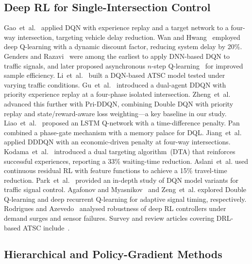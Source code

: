 \documentclass[conference]{IEEEtran}
\begin{document}
\subsection{Deep RL for Single-Intersection Control}

Gao~et~al.~\cite{Gao2017AdaptiveTSA} applied DQN with experience
replay and a target network to a four-way intersection, targeting
vehicle delay reduction. Wan and Hwang~\cite{Wan2018ValuebasedDRE}
employed deep Q-learning with a dynamic discount factor, reducing
system delay by 20\%. Genders and Razavi~\cite{Genders2016UsingADAY}
were among the earliest to apply DNN-based DQN to traffic signals,
and later proposed asynchronous $n$-step
Q-learning~\cite{Genders2019AsynchronousNQAV} for improved
sample efficiency. Li~et~al.~\cite{Li2020AdaptiveTSN} built a
DQN-based ATSC model tested under varying traffic conditions.
Gu~et~al.~\cite{Gu2020DoubleDQD} introduced a dual-agent DDQN
with priority experience replay at a four-phase isolated
intersection. Zheng~et~al.~\cite{Zheng2024PriDDQNLAG} advanced
this further with Pri-DDQN, combining Double DQN with priority
replay and state/reward-aware loss weighting---a key baseline in
our study. Liao~et~al.~\cite{Liao2020TimeDPQ} proposed an LSTM Q-network
with a time-difference penalty. Pan~\cite{Pan2023TrafficLCR}
combined a phase-gate mechanism with a memory palace for DQL.
Jiang~et~al.~\cite{Jiang2022EconomicDrivenATAI} applied DDDQN with
an economic-driven penalty at four-way intersections.
Kodama~et~al.~\cite{Kodama2022TrafficSCAA} introduced a dual
targeting algorithm~(DTA) that reinforces successful experiences,
reporting a 33\% waiting-time reduction. Aslani~et~al.
\cite{Aslani2018ContinuousRRZ} used continuous residual RL with
feature functions to achieve a 15\% travel-time reduction.
Park~et~al.~\cite{Park2021DeepQTAM} provided an in-depth study of
DQN model variants for traffic signal control. Agafonov and
Myasnikov~\cite{Agafonov2021TrafficSCBQ} and Zeng~et~al.
\cite{Zeng2018AdaptiveTSAU} explored Double Q-learning and deep
recurrent Q-learning for adaptive signal timing, respectively.
Rodrigues and Azevedo~\cite{Rodrigues2019TowardsRDSJ} analysed
robustness of deep RL controllers under demand surges and sensor
failures. Survey and review articles covering DRL-based ATSC
include~\cite{Haydari2020DeepRLC, Rasheed2020DeepRLBL,
Yau2017ASOBO, Greguri2020ApplicationODAR, Wang2022ACRBC}.

\subsection{Hierarchical and Policy-Gradient Methods}
\end{document}
